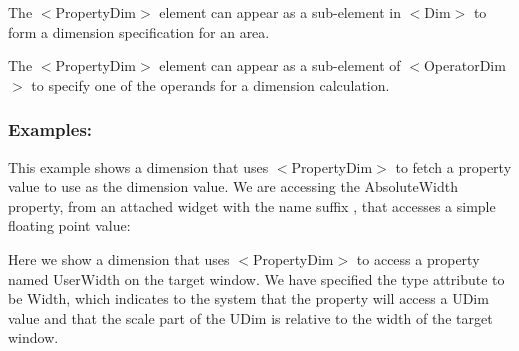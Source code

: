 \begin{DoxyItemize}
\item The {\ttfamily $<$Property\+Dim$>$} element can appear as a sub-\/element in {\ttfamily $<$Dim$>$} to form a dimension specification for an area. 
\item The {\ttfamily $<$Property\+Dim$>$} element can appear as a sub-\/element of {\ttfamily $<$Operator\+Dim$>$} to specify one of the operands for a dimension calculation. 
\end{DoxyItemize}\hypertarget{fal_element_ref_fal_elem_ref_sec_28_4}{}\subsubsection{Examples\+:}\label{fal_element_ref_fal_elem_ref_sec_28_4}
This example shows a dimension that uses {\ttfamily $<$Property\+Dim$>$} to fetch a property value to use as the dimension value. We are accessing the \textquotesingle{}Absolute\+Width\textquotesingle{} property, from an attached widget with the name suffix \textquotesingle{}, that accesses a simple floating point value\+:


\begin{DoxyCode}{0}
\end{DoxyCode}
 Here we show a dimension that uses {\ttfamily $<$Property\+Dim$>$} to access a property named \textquotesingle{}User\+Width\textquotesingle{} on the target window. We have specified the {\ttfamily type} attribute to be \textquotesingle{}Width\textquotesingle{}, which indicates to the system that the property will access a U\+Dim value and that the scale part of the U\+Dim is relative to the width of the target window.


